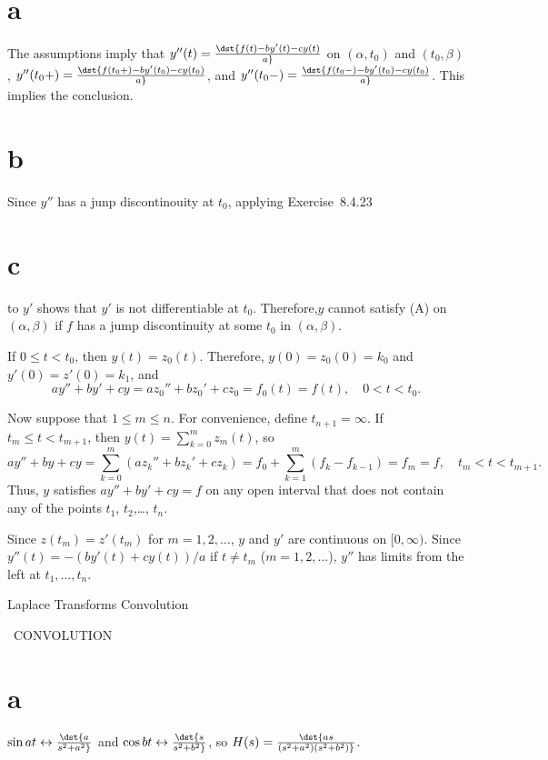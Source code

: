 \documentclass[dvips]{book}
\renewcommand{\exer}[1]{\par\medskip\;\noindent{\color{red}\bf #1.}}
\numberwithin{example}{section}
\numberwithin{equation}{section}
\numberwithin{theorem}{section}
\numberwithin{table}{section}
\numberwithin{figure}{section}
\begin{document}
\exer{8.5.24}
\part{a}
The assumptions imply that
$y''(t)=\dst{f(t)-by'(t)-cy(t)\over a}$  on $(\alpha,t_0)$
and $(t_0,\beta)$,
$y''(t_0+)=\dst{f(t_0+)-by'(t_0)-cy(t_0)\over a}$, and
$y''(t_0-)=\dst{f(t_0-)-by'(t_0)-cy(t_0)\over a}$. This implies the
conclusion.

\part{b}
Since $y''$ has a junp discontinouity at $t_0$, applying
Exercise~8.4.23\part{c} to $y'$  shows that $y'$
is not differentiable at $t_0$. Therefore,$y$ cannot satisfy
(A) on $(\alpha,\beta)$ if $f$ has a jump discontinuity at some
$t_0$ in $(\alpha,\beta)$.


\exer{8.5.26}
If $0\le t<t_0$, then $y(t)=z_0(t)$. Therefore,
$y(0)=z_0(0)=k_0$ and $y'(0)=z'(0)=k_1$, and
$$
ay''+by'+cy=az_0''+bz_0'+cz_0=f_0(t)=f(t),\quad 0<t<t_0.
$$

Now suppose that $1\le m\le n$.
For convenience, define $t_{n+1}=\infty$.
If $t_m\le t<t_{m+1}$, then $y(t)=\sum_{k=0}^m z_m(t)$, so
$$
ay''+by+cy=\sum_{k=0}^m(az_k''+bz_k'+cz_k)
=f_0+\sum_{k=1}^m(f_k-f_{k-1})=f_m=f,\quad t_m<t<t_{m+1}.
$$
Thus, $y$ satisfies $ay''+by'+cy=f$ on any open interval that does not
contain any of the points $t_1$, $t_2$,\dots, $t_n$.

Since $z(t_m)=z'(t_m)$ for $m=1,2,\dots$, $y$ and $y'$
are continuous on $[0,\infty)$. Since
$y''(t)=-(by'(t)+cy(t))/a$ if $t\ne t_m$ ($m=1,2,\dots$),
$y''$ has limits from the left at  $t_1,\dots,t_n$.



 {Laplace Transforms}
{Convolution}

\renewcommand{\thissection}{\sectiontitle
{\, CONVOLUTION}}
\thissection


\vspace*{-17.6pt}

\exer{8.6.2}
\part{a}
$\sin at\leftrightarrow\dst{a\over s^2+a^2}$ and
$\cos bt\leftrightarrow\dst{s\over s^2+b^2}$, so
   $H(s)=\dst{a s\over (s^2+a^2)(s^2+b^2)}$.
\end{document}
